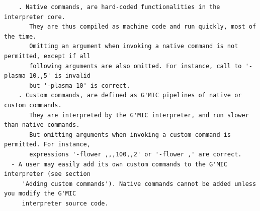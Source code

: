 \documentclass[a4paper,11pt,twoside]{book}
\begin{document}
\begin{lstlisting}
    . Native commands, are hard-coded functionalities in the interpreter core. 
       They are thus compiled as machine code and run quickly, most of the time. 
       Omitting an argument when invoking a native command is not permitted, except if all 
       following arguments are also omitted. For instance, call to '-plasma 10,,5' is invalid 
       but '-plasma 10' is correct. 
    . Custom commands, are defined as G'MIC pipelines of native or custom commands. 
       They are interpreted by the G'MIC interpreter, and run slower than native commands. 
       But omitting arguments when invoking a custom command is permitted. For instance, 
       expressions '-flower ,,,100,,2' or '-flower ,' are correct. 
  - A user may easily add its own custom commands to the G'MIC interpreter (see section 
     'Adding custom commands'). Native commands cannot be added unless you modify the G'MIC 
     interpreter source code.
\end{lstlisting}
\normalsize
\end{document}
